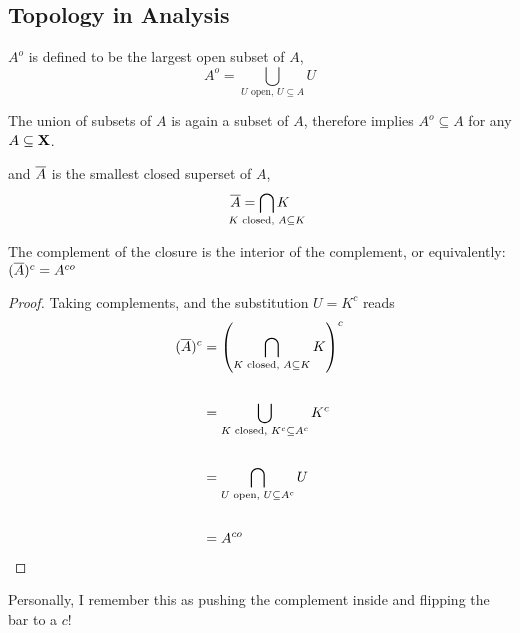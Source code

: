 \documentclass[../../main.tex]{subfiles}
\begin{document}
\newpage
\subsection*{Topology in Analysis}

\begin{definition}\label{chp4:interior-definition}
    $A^o$ is defined to be the largest open subset of $A$, 
    \[
        A^o = \bigcup_{\text{$U$ open, }U\subseteq A} U
    \]
\end{definition}
\begin{corollary}\label{chp4:interior-subset}
    The union of subsets of $A$ is again a subset of $A$, therefore  implies $A^o\subseteq A$ for any $A\subseteq {\mathbf{X}}$. 
\end{corollary}


\begin{definition}\label{chp4:closure-definition}
    and $\overline{A}$ is the smallest closed superset of $A$,
    \[
        \cl{A} = \bigcap_{\mathclap{\text{$K$ closed, } A\subseteq K}} K
    \]
\end{definition}


\begin{wts}\label{chp4:flipping-interior-to-closure}
    The complement of the closure is the interior of the complement, or equivalently: $(\overline{A})^c = A^{co}$
\end{wts}
\begin{proof}
    Taking complements, and the substitution $U = K^c$ reads
    \begin{align*}
        (\overline{A})^c &= \left(\bigcap_{{\text{$K$ closed, } A\subseteq K}} K \right)^c\\[4ex]
        &= \bigcup_{{\text{$K$ closed, } K^c\subseteq A^c}} K^c\\[4ex]
        &= \bigcap_{{\text{$U$ open, } U\subseteq A^c}} U\\[4ex]
        &= A^{co}
    \end{align*}
\end{proof}
\begin{remark}
    Personally, I remember this as pushing the complement inside and flipping the bar to a $c$!
\end{remark}
\newpage
\end{document}
